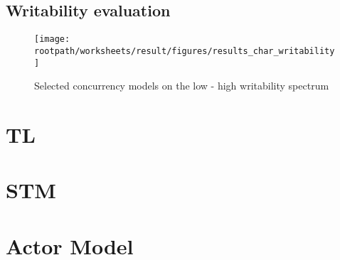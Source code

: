 \subsection{Writability evaluation}

\begin{figure}[htbp]
\centering
 \texttt{[image: \\rootpath/worksheets/result/figures/results\_char\_writability]} 
 \caption{Selected concurrency models on the low - high writability spectrum}
\label{fig:results_char_writability}
\end{figure}

\section{\acl{TL}}
\section{\acl{STM}}
\section{Actor Model}
\worksheetend
